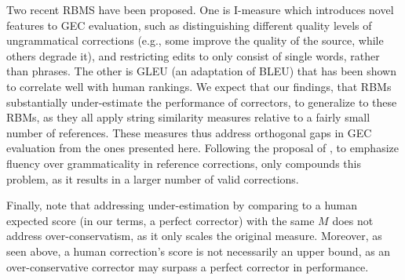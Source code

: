 \documentclass[letter,11pt]{article}
\begin{document}
Two recent RBMS have been proposed.
One is {\sc I-measure} \cite{felice2015towards}
which introduces novel features to GEC evaluation, such as distinguishing
different quality levels of ungrammatical corrections (e.g., some improve the quality of
the source, while others degrade it), and restricting edits to only consist of single words,
rather than phrases. The other is GLEU \cite{napoles2015ground} (an adaptation of BLEU) that has
been shown to correlate well with human rankings. We expect that our findings, that RBMs substantially under-estimate the
performance of correctors, to generalize to these RBMs, as they all
apply string similarity measures relative to a fairly small number of references.
These measures thus address orthogonal gaps in GEC evaluation from the ones presented here.
Following the proposal of , to emphasize fluency over grammaticality
in reference corrections, only compounds this problem, as it results in a larger number of valid corrections.


Finally, note that addressing under-estimation by comparing to
a human expected score (in our terms, a perfect corrector) with the same $M$ \cite{bryant2015far} does not address over-conservatism, as it only
scales the original measure. Moreover, as seen above, a human correction's score
is not necessarily an upper bound, as an over-conservative corrector may surpass a perfect corrector in performance.
\end{document}
